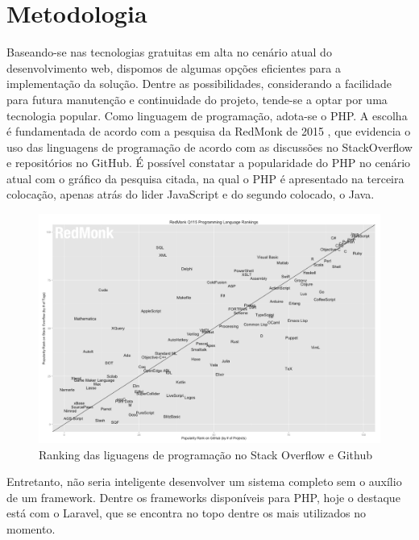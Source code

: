 \section{Metodologia} %


Baseando-se nas tecnologias gratuitas em alta no cenário atual do desenvolvimento web, dispomos de algumas opções eficientes para a implementação da solução. Dentre as possibilidades, considerando a facilidade para futura manutenção e continuidade do projeto, tende-se a optar por uma tecnologia popular. Como linguagem de programação, adota-se o PHP. A escolha é fundamentada de acordo com a pesquisa da RedMonk de 2015 \cite{Grafico-RedMonk} , que evidencia o uso das linguagens de programação de acordo com as discussões no StackOverflow e repositórios no GitHub. É possível constatar a popularidade do PHP no cenário atual com o gráfico da pesquisa citada, na qual o PHP é apresentado na terceira colocação, apenas atrás do lider JavaScript e do segundo colocado, o Java.

\begin{figure}
	\label{fig:graficoRedmonk}
	\includegraphics[width=1\textwidth]{img/grafico_redmonk}
	\caption{Ranking das liguagens de programação no Stack Overflow e Github}
\end{figure}


Entretanto, não seria inteligente desenvolver um sistema completo sem o auxílio de um framework. Dentre os frameworks disponíveis para PHP, hoje o destaque está com o Laravel, que se encontra no topo dentre os mais utilizados no momento. 
 

